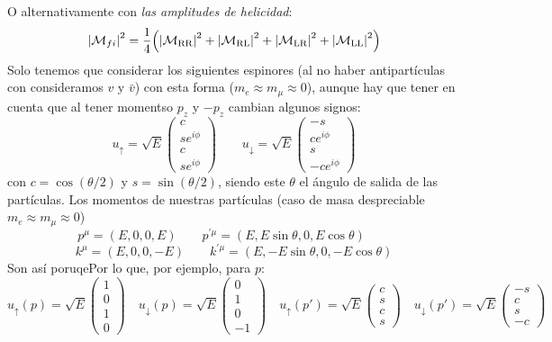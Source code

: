 O alternativamente con \textit{las amplitudes de helicidad}:
\begin{equation}
	\vqty{\Mcal_{fi}}^2 = \frac{1}{4} \pqty{\vqty{\Mcal_{\text{RR}}}^2+\vqty{\Mcal_{\text{RL}}}^2
		+\vqty{\Mcal_{\text{LR}}}^2+\vqty{\Mcal_{\text{LL}}}^2}
\end{equation}
Solo tenemos que considerar los siguientes espinores (al no haber antipartículas con consideramos $v$ y $\bar{v}$) con esta forma ($m_e\approx m_\mu\approx 0$), aunque hay que tener en cuenta que al tener momentso $p_z$ y $-p_z$ cambian algunos signos:
\begin{equation}
	u_\uparrow = \sqrt{E} \begin{pmatrix}
		c \\ se^{i\phi} \\ c \\ se^{i\phi}
	\end{pmatrix} \qquad
	u_\downarrow= \sqrt{E} \begin{pmatrix}
		-s \\ ce^{i\phi} \\ s \\ -ce^{i\phi}
	\end{pmatrix}
\end{equation}
con $c=\cos (\theta/2)$ y $s=\sin(\theta/2)$, siendo este $\theta$ el ángulo de salida de las partículas. Los momentos de nuestras partículas (caso de masa despreciable $m_e\approx m_\mu\approx 0$)
\begin{equation}
    p^\mu= (E,0,0,E) \qquad 
    p^{\prime\mu}= (E,E\sin \theta,0,E \cos \theta) \qquad 
\end{equation}
\begin{equation}
    k^\mu= (E,0,0,-E) \qquad 
    k^{\prime\mu}= (E,-E\sin \theta,0,-E \cos \theta)
\end{equation}
Son así poruqePor lo que, por ejemplo, para $p$:
\begin{equation}
	u_\uparrow(p) = \sqrt{E} \begin{pmatrix}
		1 \\ 0 \\ 1 \\ 0
	\end{pmatrix} \quad
	u_\downarrow(p)= \sqrt{E} \begin{pmatrix}
		0 \\ 1 \\ 0 \\ -1
	\end{pmatrix}\quad
	u_\uparrow(p') = \sqrt{E} \begin{pmatrix}
		c \\ s \\ c \\ s
	\end{pmatrix} \quad
	u_\downarrow(p')= \sqrt{E} \begin{pmatrix}
		-s \\ c \\ s \\ -c
	\end{pmatrix}
\end{equation}
